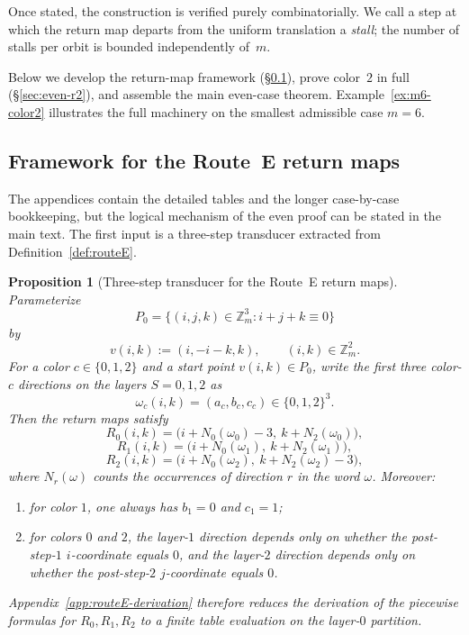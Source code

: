 \documentclass[11pt]{article}
\newtheorem{proposition}{Proposition}
\begin{document}
Once stated, the construction is verified purely combinatorially.
We call a step at which the return map departs from the uniform translation a \emph{stall}; the number of stalls per orbit is bounded independently of~$m$.

Below we develop the return-map framework (\S\ref{sec:framework}), prove color~$2$ in full (\S\ref{sec:even-r2}), and assemble the main even-case theorem.
Example~\ref{ex:m6-color2} illustrates the full machinery on the smallest admissible case $m=6$.

\subsection{Framework for the Route~E return maps}\label{sec:framework}

The appendices contain the detailed tables and the longer case-by-case bookkeeping, but the logical mechanism of the even proof can be stated in the main text.
The first input is a three-step transducer extracted from Definition~\ref{def:routeE}.

\begin{proposition}[Three-step transducer for the Route~E return maps]\label{prop:routeE-transducer}
Parameterize
\[
P_0=\{(i,j,k)\in \mathbb Z_m^3:i+j+k\equiv 0\}
\]
by
\[
v(i,k):=(i,-i-k,k),\qquad (i,k)\in \mathbb Z_m^2.
\]
For a color $c\in\{0,1,2\}$ and a start point $v(i,k)\in P_0$, write the first three color-$c$ directions on the layers $S=0,1,2$ as
\[
\omega_c(i,k)=(a_c,b_c,c_c)\in\{0,1,2\}^3.
\]
Then the return maps satisfy
\[
R_0(i,k)=\bigl(i+N_0(\omega_0)-3,\ k+N_2(\omega_0)\bigr),
\]
\[
R_1(i,k)=\bigl(i+N_0(\omega_1),\ k+N_2(\omega_1)\bigr),
\]
\[
R_2(i,k)=\bigl(i+N_0(\omega_2),\ k+N_2(\omega_2)-3\bigr),
\]
where $N_r(\omega)$ counts the occurrences of direction $r$ in the word $\omega$.
Moreover:
\begin{enumerate}[label=\textup{(\roman*)},leftmargin=2.5em]
\item for color $1$, one always has $b_1=0$ and $c_1=1$;
\item for colors $0$ and $2$, the layer-$1$ direction depends only on whether the post-step-$1$ $i$-coordinate equals $0$, and the layer-$2$ direction depends only on whether the post-step-$2$ $j$-coordinate equals $0$.
\end{enumerate}
Appendix~\ref{app:routeE-derivation} therefore reduces the derivation of the piecewise formulas for $R_0,R_1,R_2$ to a finite table evaluation on the layer-$0$ partition.
\end{proposition}
\end{document}
